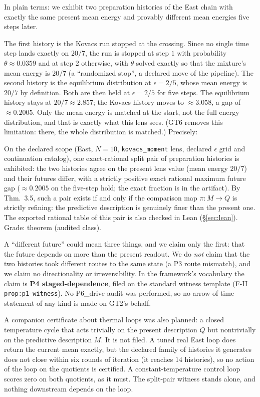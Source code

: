 In plain terms: we exhibit two preparation histories of the East chain with exactly the same
present mean energy and provably different mean energies five steps later.

The first history is the Kovacs run stopped at the crossing. Since no single time step lands
exactly on $20/7$, the run is stopped at step $1$ with probability $\theta \approx 0.0359$ and at
step $2$ otherwise, with $\theta$ solved exactly so that the mixture's mean energy is $20/7$ (a
``randomized stop'', a declared move of the pipeline). The second history is the equilibrium
distribution at $\epsilon = 2/5$, whose mean energy is $20/7$ by definition. Both are then held at
$\epsilon = 2/5$ for five steps. The equilibrium history stays at $20/7 \approx 2.857$; the Kovacs
history moves to $\approx 3.058$, a gap of $\approx 0.2005$. Only the mean energy is matched at the
start, not the full energy distribution, and that is exactly what this lens sees. (GT6 removes
this limitation: there, the whole distribution is matched.) Precisely:

On the declared scope (East, $N=10$, \texttt{kovacs\_moment} lens, declared $\epsilon$ grid and
continuation catalog), one exact-rational split pair of preparation histories is exhibited: the
two histories agree on the present lens value (mean energy $20/7$) and their futures differ, with
a strictly positive exact rational maximum future gap ($\approx 0.2005$ on the five-step hold; the
exact fraction is in the artifact). By  Thm.~3.5, such a pair exists if and
only if the comparison map $\pi: M \to Q$ is strictly refining: the predictive description is
genuinely finer than the present one. The exported rational table of this pair is also checked in
Lean (\S\ref{sec:lean}). Grade: theorem (audited class).

A ``different future'' could mean three things, and we claim only the first: that the future
depends on more than the present readout. We do \emph{not} claim that the two histories took
different routes to the same state (a P3 route mismatch), and we claim no directionality or
irreversibility. In the framework's vocabulary the claim is \textbf{P4 staged-dependence}, filed on
the standard witness template (F-II \texttt{prop:p1-witness}). No P6\_drive audit was performed,
so no arrow-of-time statement of any kind is made on GT2's behalf.

A companion certificate about thermal loops was also planned: a closed temperature cycle that acts
trivially on the present description $Q$ but nontrivially on the predictive description $M$. It
is not filed. A tuned real East loop does return the current mean exactly, but the declared family
of histories it generates does not close within six rounds of iteration (it reaches $14$
histories), so no action of the loop on the quotients is certified. A constant-temperature
control loop scores zero on both quotients, as it must. The split-pair witness stands alone, and
nothing downstream depends on the loop.

